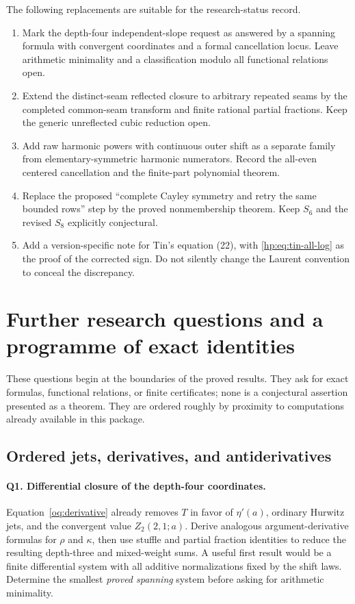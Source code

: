 \documentclass[11pt,a4paper]{article}
\numberwithin{equation}{section}
\theoremstyle{definition}
\theoremstyle{remark}
\begin{document}
The following replacements are suitable for the research-status record.
\begin{enumerate}
\item Mark the depth-four independent-slope request as answered by a
spanning formula with convergent coordinates and a formal cancellation
locus. Leave arithmetic minimality and a classification modulo all
functional relations open.
\item Extend the distinct-seam reflected closure to arbitrary repeated
seams by the completed common-seam transform and finite rational
partial fractions. Keep the generic unreflected cubic reduction open.
\item Add raw harmonic powers with continuous outer shift as a separate
family from elementary-symmetric harmonic numerators. Record the
all-even centered cancellation and the finite-part polynomial theorem.
\item Replace the proposed ``complete Cayley symmetry and retry the
same bounded rows'' step by the proved nonmembership theorem. Keep
$S_6$ and the revised $S_8$ explicitly conjectural.
\item Add a version-specific note for Tin's equation (22), with
\eqref{hp:eq:tin-all-log} as the proof of the corrected sign. Do not
silently change the Laurent convention to conceal the discrepancy.
\end{enumerate}



\section{Further research questions and a programme of exact identities}
\label{research:section}

These questions begin at the boundaries of the proved results. They
ask for exact formulas, functional relations, or finite certificates;
none is a conjectural assertion presented as a theorem. They are ordered
roughly by proximity to computations already available in this package.

\subsection{Ordered jets, derivatives, and antiderivatives}

\paragraph{Q1. Differential closure of the depth-four coordinates.}
Equation~\eqref{oq:derivative} already removes $T$ in favor of
$\eta'(a)$, ordinary Hurwitz jets, and the convergent value
$Z_2(2,1;a)$. Derive analogous argument-derivative formulas for
$\rho$ and $\kappa$, then use stuffle and partial fraction identities
to reduce the resulting depth-three and mixed-weight sums. A useful
first result would be a finite differential system with all additive
normalizations fixed by the shift laws. Determine the smallest
\emph{proved spanning} system before asking for arithmetic minimality.
\end{document}
